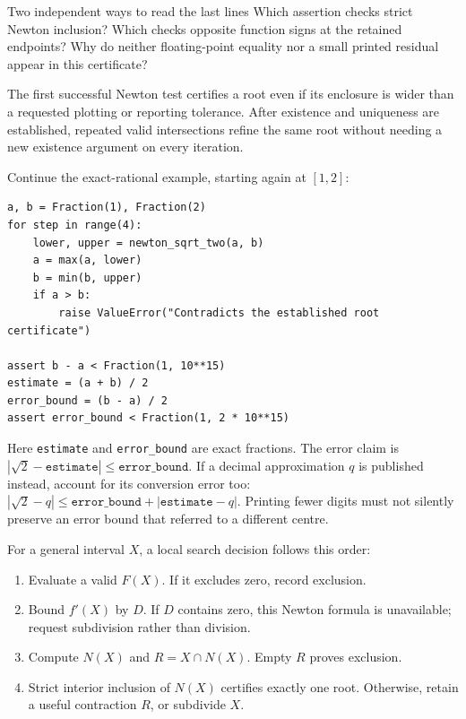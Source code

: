 \begin{question}{Two independent ways to read the last lines}
Which assertion checks strict Newton inclusion? Which checks opposite
function signs at the retained endpoints? Why do neither floating-point
equality nor a small printed residual appear in this certificate?
\end{question}

\newpage
{}
The first successful Newton test certifies a root even if its enclosure is
wider than a requested plotting or reporting tolerance. After existence and
uniqueness are established, repeated valid intersections refine the same
root without needing a new existence argument on every iteration.

Continue the exact-rational example, starting again at $[1,2]$:
\begin{lstlisting}
a, b = Fraction(1), Fraction(2)
for step in range(4):
    lower, upper = newton_sqrt_two(a, b)
    a = max(a, lower)
    b = min(b, upper)
    if a > b:
        raise ValueError("Contradicts the established root certificate")

assert b - a < Fraction(1, 10**15)
estimate = (a + b) / 2
error_bound = (b - a) / 2
assert error_bound < Fraction(1, 2 * 10**15)
\end{lstlisting}

Here \texttt{estimate} and \texttt{error\_bound} are exact fractions.
The error claim is $|\sqrt2-\texttt{estimate}|\le\texttt{error\_bound}$.
If a decimal approximation $q$ is published instead, account for its
conversion error too: $|\sqrt2-q|\le\texttt{error\_bound}
+|\texttt{estimate}-q|$. Printing fewer digits must not silently preserve
an error bound that referred to a different centre.

For a general interval $X$, a local search decision follows this order:
\begin{enumerate}
\item Evaluate a valid $F(X)$. If it excludes zero, record exclusion.
\item Bound $f'(X)$ by $D$. If $D$ contains zero, this Newton formula is
unavailable; request subdivision rather than division.
\item Compute $N(X)$ and $R=X\cap N(X)$. Empty $R$ proves exclusion.
\item Strict interior inclusion of $N(X)$ certifies exactly one root.
Otherwise, retain a useful contraction $R$, or subdivide $X$.
\end{enumerate}

